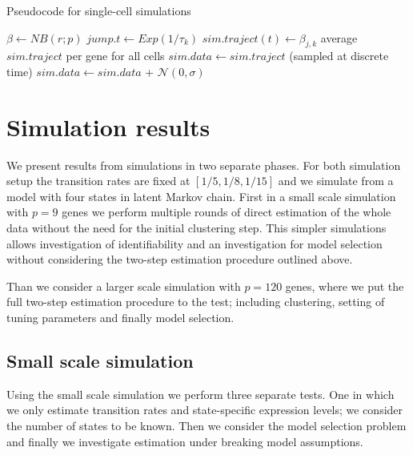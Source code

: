 \begin{algorithm}
    \caption{Pseudocode for single-cell simulations}\label{alg:simulation-framework}
    \begin{algorithmic}[0]
        \State $\beta \gets   NB(r;p)$
        \State $jump.t \gets Exp(1/\tau_k)$
        \State $sim.traject(t) \gets \beta_{j,k}$
        \EndWhile
        \EndFor
        \EndFor
        \State average $sim.traject$ per gene for all cells
        \State $sim.data \gets sim.traject$ (sampled at discrete time)
        \State $sim.data \gets sim.data$ + $\mathcal{N}(0, \sigma)$
        \EndProcedure
      \end{algorithmic}
\end{algorithm}

\section{Simulation results}
\label{sec:results}

We present results from simulations in two separate phases. For both simulation setup the transition rates are fixed at $[1/5, 1/8, 1/15]$ and we simulate from a model with four states in latent Markov chain. First in a small scale simulation with $p=9$ genes we perform multiple rounds of direct estimation of the whole data without the need for the initial clustering step. This simpler simulations allows investigation of identifiability and an investigation for model selection without considering the two-step estimation procedure outlined above.

Than we consider a larger scale simulation with $p=120$ genes, where we put the full two-step estimation procedure to the test; including clustering, setting of tuning parameters and finally model selection.



\subsection{Small scale simulation}
\label{sec:small-scale-model}

Using the small scale simulation we perform three separate  tests. One in which we only estimate transition rates and state-specific expression levels; we consider the number of states to be known. Then we consider the model selection problem and finally we investigate estimation under breaking model assumptions.

